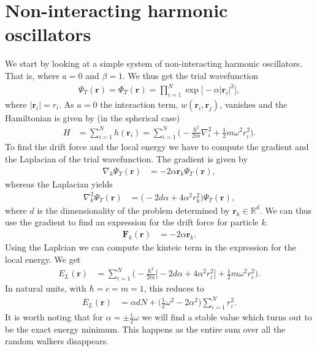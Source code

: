 \documentclass[
    a4paper, aps, twocolumn, floatfix, superscriptaddress, nofootinbib]{revtex4-1}
\newcommand{\vf}{\mathbf}
\newcommand{\1}{\mathds{1}}
\newcommand{\half}{\frac{1}{2}}
\begin{document}
\section{Non-interacting harmonic oscillators}
    We start by looking at a simple system of non-interacting harmonic
    oscillators. That is, where $a = 0$ and $\beta = 1$. We thus get the trial
    wavefunction
    \begin{align}
        \Psi_T(\vf{r})
        = \Phi_T(\vf{r})
        = \prod_{i = 1}^N \exp\bigl[
            -\alpha |\vf{r}_i|^2
        \bigr],
    \end{align}
    where $|\vf{r}_i| = r_i$. As $a = 0$ the interaction term,
    $w(\vf{r}_i, \vf{r}_j)$, vanishes and the Hamiltonian is given by
    (in the spherical case)
    \begin{align}
        H &= \sum_{i = 1}^N h(\vf{r}_i)
        = \sum_{i = 1}^N \Biggl(
            -\frac{\hbar^2}{2m}\nabla_i^2
            + \half m \omega^2 r_i^2
        \Biggr).
    \end{align}
    To find the drift force and the local energy we have to compute the gradient
    and the Laplacian of the trial wavefunction. The gradient is given by
    \begin{align}
        \nabla_k\Psi_T(\vf{r})
        &= -2\alpha \vf{r}_k\Psi_T(\vf{r}),
    \end{align}
    whereas the Laplacian yields
    \begin{align}
        \nabla^2_k\Psi_T(\vf{r})
        &= \big(-2d\alpha + 4\alpha^2 r_k^2\bigr)\Psi_T(\vf{r}),
    \end{align}
    where $d$ is the dimensionality of the problem determined by
    $\vf{r}_k \in \mathbb{R}^d$. We can thus use the gradient to find an
    expression for the drift force for particle $k$.
    \begin{align}
        \vf{F}_k(\vf{r})
        &= -2\alpha\vf{r}_k.
    \end{align}
    Using the Laplcian we can compute the kinteic term in the expression for the
    local energy. We get
    \begin{align}
        E_L(\vf{r})
        &=
        \sum_{i = 1}^N
        \Biggl(
            -\frac{\hbar^2}{2m}
            \bigl[
                -2d\alpha + 4\alpha^2 r_i^2
            \bigr]
            + \half m\omega^2 r_i^2
        \Biggr).
    \end{align}
    In natural units, with $\hbar = c = m = 1$, this reduces to
    \begin{align}
        E_L(\vf{r})
        &=
        \alpha dN
        + \biggl(
            \half\omega^2
            - 2\alpha^2
        \biggr)
        \sum_{i = 1}^N r_i^2.
    \end{align}
    It is worth noting that for $\alpha = \pm\half\omega$ we will find a stable
    value which turns out to be the exact energy minimum. This happens as the
    entire sum over all the random walkers disappears.
\end{document}
